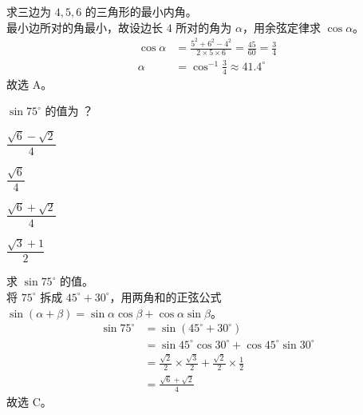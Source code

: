 \documentclass[12pt,a4paper,fontset=none]{exam-zh}
\begin{document}
\begin{solution}
    求三边为 $4,5,6$ 的三角形的最小内角。 \\
    最小边所对的角最小，故设边长 $4$ 所对的角为 $\alpha$，用余弦定律求 $\cos\alpha$。 \\
    \begin{align*}
        \cos\alpha &= \frac{5^2+6^2-4^2}{2\times5\times6} = \frac{45}{60} = \frac{3}{4} \\
        \alpha &= \cos^{-1}\frac{3}{4} \approx 41.4^{\circ}
    \end{align*}
    故选 A。
\end{solution}

\begin{question}
    $\sin 75^\circ$ 的值为 \paren[C]？
    \begin{choices}
        \item $\dfrac{\sqrt{6}-\sqrt{2}}{4}$
        \item $\dfrac{\sqrt{6}}{4}$
        \item $\dfrac{\sqrt{6}+\sqrt{2}}{4}$
        \item $\dfrac{\sqrt{3}+1}{2}$
    \end{choices}
\end{question}

\begin{solution}
    求 $\sin 75^\circ$ 的值。 \\
    将 $75^\circ$ 拆成 $45^\circ+30^\circ$，用两角和的正弦公式 $\sin(\alpha+\beta)=\sin\alpha\cos\beta+\cos\alpha\sin\beta$。 \\
    \begin{align*}
        \sin 75^\circ&=\sin(45^\circ+30^\circ) \\
        &=\sin 45^\circ\cos 30^\circ+\cos 45^\circ\sin 30^\circ \\
        &=\frac{\sqrt{2}}{2}\times\frac{\sqrt{3}}{2}+\frac{\sqrt{2}}{2}\times\frac{1}{2} \\
        &=\frac{\sqrt{6}+\sqrt{2}}{4}
    \end{align*}
    故选 C。
\end{solution}
\end{document}
